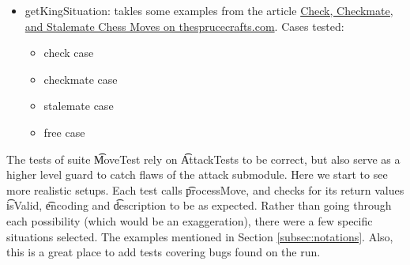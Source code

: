 \begin{itemize}
    \item \b{getKingSituation}: takles some examples from the article \href{https://www.thesprucecrafts.com/check-checkmate-and-stalemate-611546}{Check, Checkmate, and Stalemate Chess Moves on thesprucecrafts.com}. Cases tested:
    \begin{itemize}
        \item check case
        \item checkmate case
        \item stalemate case
        \item free case
    \end{itemize}
\end{itemize}

The tests of suite \t{MoveTest} rely on \t{AttackTest}s to be correct, but also serve as a higher level guard to catch flaws of the attack submodule. Here we start to see more realistic setups. Each test calls \t{processMove}, and checks for its return values \t{isValid}, \t{encoding} and \t{description} to be as expected. Rather than going through each possibility (which would be an exaggeration), there were a few specific situations selected. The examples mentioned in Section \ref{subsec:notations}. Also, this is a great place to add tests covering bugs found on the run.

